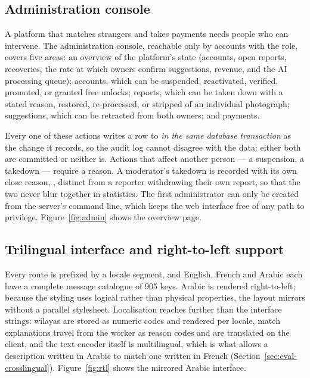 
\subsection{Administration console}

A platform that matches strangers and takes payments needs people who can
intervene. The administration console, reachable only by accounts with the
 role, covers five areas: an overview of the platform's state
(accounts, open reports, recoveries, the rate at which owners confirm
suggestions, revenue, and the AI processing queue); accounts, which can be
suspended, reactivated, verified, promoted, or granted free unlocks; reports,
which can be taken down with a stated reason, restored, re-processed, or
stripped of an individual photograph; suggestions, which can be retracted from
both owners; and payments.

Every one of these actions writes a row to  \emph{in the
same database transaction} as the change it records, so the audit log cannot
disagree with the data: either both are committed or neither is. Actions that
affect another person --- a suspension, a takedown --- require a reason. A
moderator's takedown is recorded with its own close reason, ,
distinct from a reporter withdrawing their own report, so that the two never
blur together in statistics. The first administrator can only be created from
the server's command line, which keeps the web interface free of any path to
privilege. Figure~\ref{fig:admin} shows the overview page.


\subsection{Trilingual interface and right-to-left support}

Every route is prefixed by a locale segment, and English, French and Arabic each
have a complete message catalogue of 905 keys. Arabic is rendered right-to-left;
because the styling uses logical rather than physical properties, the layout
mirrors without a parallel stylesheet. Localisation reaches further than the
interface strings: wilayas are stored as numeric codes and rendered per locale,
match explanations travel from the worker as reason codes and are translated on
the client, and the text encoder itself is multilingual, which is what allows a
description written in Arabic to match one written in French
(Section~\ref{sec:eval-crosslingual}). Figure~\ref{fig:rtl} shows the mirrored
Arabic interface.

